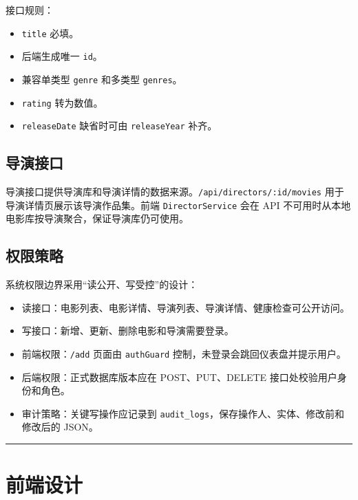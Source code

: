 \documentclass[
]{ctexart}
\providecommand{\tightlist}{%
  \setlength{\itemsep}{0pt}\setlength{\parskip}{0pt}}
\begin{document}
接口规则：

\begin{itemize}
\tightlist
\item
  \texttt{title} 必填。
\item
  后端生成唯一 \texttt{id}。
\item
  兼容单类型 \texttt{genre} 和多类型 \texttt{genres}。
\item
  \texttt{rating} 转为数值。
\item
  \texttt{releaseDate} 缺省时可由 \texttt{releaseYear} 补齐。
\end{itemize}

\hypertarget{ux5bfcux6f14ux63a5ux53e3}{%
\subsection{导演接口}\label{ux5bfcux6f14ux63a5ux53e3}}

导演接口提供导演库和导演详情的数据来源。\texttt{/api/directors/:id/movies}
用于导演详情页展示该导演作品集。前端 \texttt{DirectorService} 会在 API
不可用时从本地电影库按导演聚合，保证导演库仍可使用。

\hypertarget{ux6743ux9650ux7b56ux7565}{%
\subsection{权限策略}\label{ux6743ux9650ux7b56ux7565}}

系统权限边界采用``读公开、写受控''的设计：

\begin{itemize}
\tightlist
\item
  读接口：电影列表、电影详情、导演列表、导演详情、健康检查可公开访问。
\item
  写接口：新增、更新、删除电影和导演需要登录。
\item
  前端权限：\texttt{/add} 页面由 \texttt{authGuard}
  控制，未登录会跳回仪表盘并提示用户。
\item
  后端权限：正式数据库版本应在 POST、PUT、DELETE
  接口处校验用户身份和角色。
\item
  审计策略：关键写操作应记录到
  \texttt{audit\_logs}，保存操作人、实体、修改前和修改后的 JSON。
\end{itemize}

\begin{center}\rule{0.5\linewidth}{0.5pt}\end{center}

\hypertarget{ux524dux7aefux8bbeux8ba1}{%
\section{前端设计}\label{ux524dux7aefux8bbeux8ba1}}
\end{document}
